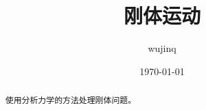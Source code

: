 \documentclass[UTF8]{ctexart}
\title{刚体运动}
\author{wujinq}
\date{\today}
\begin{document}
\maketitle

\begin{abstract}
    使用分析力学的方法处理刚体问题。
\end{abstract}
\end{document}
